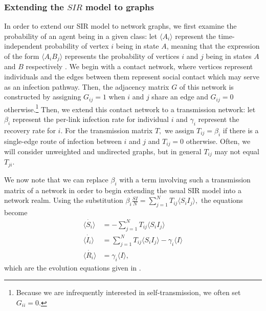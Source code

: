 \documentclass[../report.tex]{subfiles}
\begin{document}

\subsubsection{Extending the $SIR$ model to graphs}

In order to extend our SIR model to network graphs, we first examine the probability of an agent being in a given class: let $\langle A_i \rangle$ represent the time-independent probability of vertex $i$ being in state $A$, meaning that the expression of the form $\langle A_i B_j \rangle$ represents the probability of vertices $i$ and $j$ being in states $A$ and $B$ respectively \cite{kiss_2014}. We begin with a contact network, where vertices represent individuals and the edges between them represent social contact which may serve as an infection pathway. Then, the adjacency matrix $G$ of this network is constructed by assigning $G_{ij} = 1$ when $i$ and $j$ share an edge and $G_{ij} = 0$ otherwise.\footnote{Because we are infrequently interested in self-transmission, we often set $G_{ii}=0.$} Then, we extend this contact network to a transmission network: let $\beta_i$ represent the per-link infection rate for individual $i$ and $\gamma_i$ represent the recovery rate for $i$. For the transmission matrix $T,$ we assign $T_{ij}=\beta_i$ if there is a single-edge route of infection between $i$ and $j$ and $T_{ij}=0$ otherwise. Often, we will consider unweighted and undirected graphs, but in general $T_{ij}$ may not equal $T_{ji}$.

We now note that we can replace $\beta_i$ with a term involving such a transmission matrix of a network in order to begin extending the usual SIR model into a network realm. Using the substitution $ \beta_i \frac{SI}{N} = \sum^{N}_{j=1}T_{ij} \langle S_i I_j \rangle,$ the equations become
\begin{align*}
\dot{\langle S_i \rangle} & = -\sum^{N}_{j=1}T_{ij} \langle S_i I_j \rangle\\
\dot{\langle I_i \rangle} & =\sum^{N}_{j=1}T_{ij}\langle S_i I_j \rangle - \gamma_i \langle I \rangle \\
\dot{\langle R_i \rangle} & = \gamma_i \langle I \rangle,
\end{align*}
which are the evolution equations given in \cite{kiss_2014}.
\end{document}
